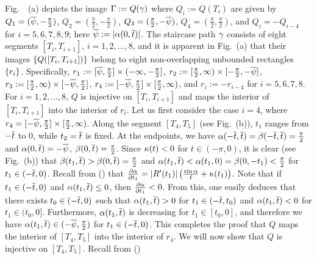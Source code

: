 Fig.\ \figeight\ (a) depicts the image  $\Gamma:=Q(\gamma)$ where $Q_i:=Q(T_i)$ are given by
$Q_1=(\overline \psi,-\frac\pi2)$, $Q_2=(\frac\pi2,-\frac\pi2)$, $Q_3=(\frac\pi2,-\overline \psi)$, $Q_4=(\frac\pi2,\frac\pi2)$, and
$Q_i=-Q_{i-4}$ for $i=5,6,7,8,9$; here $\overline \psi:=|\alpha(0,\overline t)|$.
The staircase path $\gamma$ consists of eight segments
$[T_i,T_{i+1}]$, $i=1,2,\ldots,8$, and it is apparent in Fig.\ \figeight(a) that their images $\{Q([T_i,T_{i+1}])\}$
belong to eight non-overlapping unbounded rectangles $\{r_i\}$. Specifically,
$r_1:=[\overline \psi,\frac\pi2]\times (-\infty,-\frac\pi2]$, $r_2:=[\frac\pi2,\infty)\times [-\frac\pi2,-\overline \psi]$,
$r_3:=[\frac\pi2,\infty) \times [-\overline \psi,\frac\pi2]$, $r_4:=[-\overline \psi,\frac\pi2]\times [\frac\pi2,\infty)$, and
$r_i:=-r_{i-4}$ for $i=5,6,7,8$.
%
 For $i=1,2,\ldots,8$,
$Q$ is injective on $[T_i,T_{i+1}]$ and maps the interior of $[T_i,T_{i+1}]$ into the interior of $r_i$.
\endproclaim
%
 Let us first consider the case $i=4$, where $r_4=[-\overline \psi,\frac\pi2]\times [\frac\pi2,\infty)$.
Along the segment $[T_4,T_5]$ (see Fig.\ \figten(b)), $t_1$ ranges from $-\overline t$ to $0$, while
$t_2=\overline t$ is fixed. At the endpoints, we have $\alpha(-\overline t,\overline t)=\beta(-\overline t,\overline t)=\frac\pi2$ and
$\alpha(0,\overline t)=-\overline \psi$, $\beta(0,\overline t)=\frac\pi2$.
Since $\kappa(t)<0$ for $t\in(-\pi,0)$, it is clear (see Fig.\ \figeight(b)) that
$\beta(t_1,\overline t)>\beta(0,\overline t)=\frac\pi2$ and $\alpha(t_1,\overline t)<\alpha(t_1,0)=\beta(0,-t_1)<\frac\pi2$ for $t_1\in(-\overline t,0)$.\newline
Recall from (\elalphar) that $\frac{\partial\alpha}{\partial t_1}=|R'(t_1)|\left( {\frac{\sin\alpha}\ell + \kappa(t_1)} \right)$.
Note that if  $t_1\in(-\overline t,0)$ and $\alpha(t_1,\overline t)\leq 0$, then
$\frac{\partial\alpha}{\partial t_1}<0$. From this, one easily deduces that there exists $t_0\in(-\overline t,0)$ such that
$\alpha(t_1,\overline t)>0$ for $t_1\in(-\overline t,t_0)$ and $\alpha(t_1,\overline t)<0$ for $t_1\in(t_0,0]$. Furthermore,
$\alpha(t_1,\overline t)$ is decreasing for $t_1\in[t_0,0]$, and therefore we have
$\alpha(t_1,\overline t)\in (-\overline \psi,\frac\pi2)$ for $t_1\in(-\overline t,0)$.  This completes the proof that $Q$ maps the interior of
$[T_4,T_5]$ into the interior of $r_4$. We will now show that $Q$ is injective on $[T_4,T_5]$. Recall from (\elalphar)
